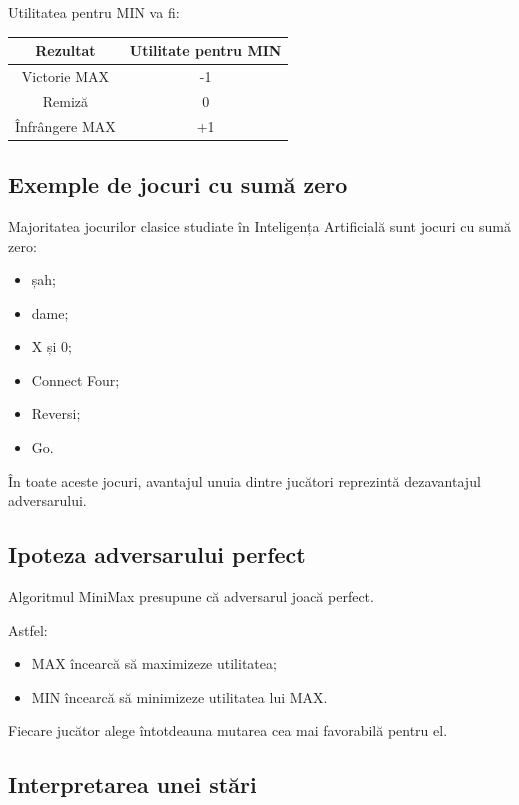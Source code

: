 \documentclass[12pt,a4paper]{article}
\begin{document}
Utilitatea pentru MIN va fi:

\begin{center}
\begin{tabular}{|c|c|}
\hline
Rezultat & Utilitate pentru MIN \\
\hline
Victorie MAX & -1 \\
\hline
Remiză & 0 \\
\hline
Înfrângere MAX & +1 \\
\hline
\end{tabular}
\end{center}

\subsection{Exemple de jocuri cu sumă zero}

Majoritatea jocurilor clasice studiate în Inteligența Artificială sunt jocuri cu sumă zero:

\begin{itemize}
\item șah;
\item dame;
\item X și 0;
\item Connect Four;
\item Reversi;
\item Go.
\end{itemize}

În toate aceste jocuri, avantajul unuia dintre jucători reprezintă dezavantajul adversarului.

\subsection{Ipoteza adversarului perfect}

Algoritmul MiniMax presupune că adversarul joacă perfect.

Astfel:

\begin{itemize}
\item MAX încearcă să maximizeze utilitatea;
\item MIN încearcă să minimizeze utilitatea lui MAX.
\end{itemize}

Fiecare jucător alege întotdeauna mutarea cea mai favorabilă pentru el.

\subsection{Interpretarea unei stări}
\end{document}
